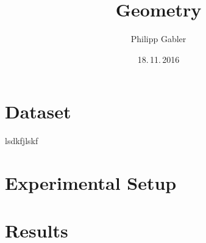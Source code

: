 \documentclass{beamer}
\author{Philipp Gabler}
\title{Geometry}
\date{18.\,11.\,2016}
\begin{document}
\section{Dataset}
\begin{frame}
lsdkfjlskf
\end{frame}


\section{Experimental Setup}
\begin{frame}  %
\end{frame}



\section{Results}
\begin{frame}
\end{frame}


\end{document}
